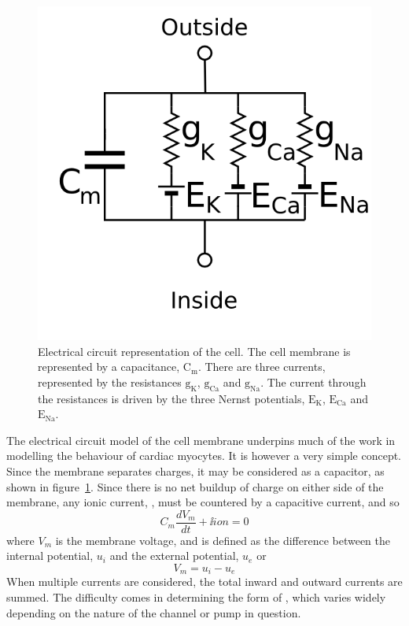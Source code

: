 \begin{figure}
\begin{center}
\includegraphics{figures/intro/electrical_circuit_cell}
\end{center}
\caption[Electrical Circuit Model Of The Cell]{
\label{fig:intro:math:circuit}
Electrical circuit representation of the cell.
The cell membrane is represented by a capacitance, $\text{C}_{\text{m}}$.
There are three currents, represented by the resistances $\text{g}_{\text{K}}$, 
$\text{g}_{\text{Ca}}$ and $\text{g}_{\text{Na}}$.
The current through the resistances is driven by the three Nernst potentials,
$\text{E}_{\text{K}}$, 
$\text{E}_{\text{Ca}}$ and $\text{E}_{\text{Na}}$.
}
\end{figure}

The electrical circuit model of the cell membrane underpins much of the work in
modelling the behaviour of cardiac myocytes.
It is however a very simple concept.
Since the membrane separates charges, it may be considered as a capacitor, as
shown in figure~\ref{fig:intro:math:circuit}.
Since there is no net buildup of
charge on either side of the membrane, any ionic current, , must be
countered by a capacitive current, and so
\begin{equation}
C_{m}\frac{dV_{m}}{dt} + \ii{ion} = 0
\label{eqn:intro:math:basic}
\end{equation}
where $V_{m}$ is the membrane voltage, and is defined as the difference between
the internal potential, $u_{i}$ and the external potential, $u_{e}$ or
\begin{equation}
V_{m} = u_{i} - u_{e}
\label{eqn:intro:math:vm}
\end{equation}
When multiple currents are considered, the total inward and outward currents are
summed.
The difficulty comes in determining the form of , which varies widely
depending on the nature of the channel or pump in question.


